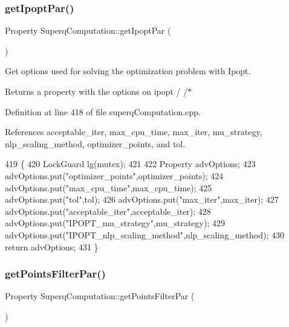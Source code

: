 \subsubsection{\texorpdfstring{get\+Ipopt\+Par()}{getIpoptPar()}}
{\footnotesize\ttfamily Property Superq\+Computation\+::get\+Ipopt\+Par (\begin{DoxyParamCaption}{ }\end{DoxyParamCaption})}



Get options used for solving the optimization problem with Ipopt. 

\begin{DoxyReturn}{Returns}
a property with the options on ipopt / /$\ast$ 
\end{DoxyReturn}


Definition at line 418 of file superq\+Computation.\+cpp.



References acceptable\+\_\+iter, max\+\_\+cpu\+\_\+time, max\+\_\+iter, mu\+\_\+strategy, nlp\+\_\+scaling\+\_\+method, optimizer\+\_\+points, and tol.


\begin{DoxyCode}
419 \{
420     LockGuard lg(mutex);
421 
422     Property advOptions;
423     advOptions.put(\textcolor{stringliteral}{"optimizer\_points"},optimizer_points);
424     advOptions.put(\textcolor{stringliteral}{"max\_cpu\_time"},max_cpu_time);
425     advOptions.put(\textcolor{stringliteral}{"tol"},tol);
426     advOptions.put(\textcolor{stringliteral}{"max\_iter"},max_iter);
427     advOptions.put(\textcolor{stringliteral}{"acceptable\_iter"},acceptable_iter);
428     advOptions.put(\textcolor{stringliteral}{"IPOPT\_mu\_strategy"},mu_strategy);
429     advOptions.put(\textcolor{stringliteral}{"IPOPT\_nlp\_scaling\_method"},nlp_scaling_method);
430     \textcolor{keywordflow}{return} advOptions;
431 \}
\end{DoxyCode}
\mbox{\label{classSuperqComputation_a110d429be796961d8c4fe8ce9b944362}} 
\subsubsection{\texorpdfstring{get\+Points\+Filter\+Par()}{getPointsFilterPar()}}
{\footnotesize\ttfamily Property Superq\+Computation\+::get\+Points\+Filter\+Par (\begin{DoxyParamCaption}{ }\end{DoxyParamCaption})}




